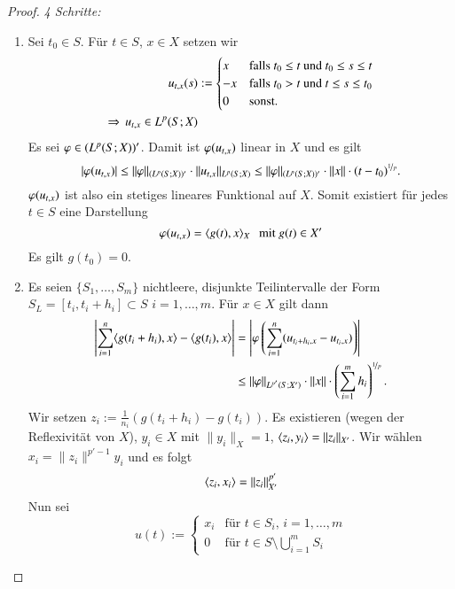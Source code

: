 \begin{proof}
    \textit{4 Schritte:}
    \begin{enumerate}
        \item %
        Sei $t_0\in S$. Für $t\in S$, $x\in X$ setzen wir
        \begin{align*}
            u_{t,x}(s) &:= \begin{cases} x & \text{falls $t_0\leq t$ und $t_0\leq s \leq t$}\\
                        -x & \text{falls $t_0>t$ und $t\leq s \leq t_0$} \\
                        0 & \text{sonst}.\end{cases}\\
            \Rightarrow \, u_{t,x} \in L^p (S;X)
        \end{align*}
        Es sei $\varphi\in (L^p(S;X))'$. Damit ist $\varphi(u_{t,x})$ linear in $X$ und es gilt
        \[
            |\varphi(u_{t,x})|\leq \|\varphi\|_{(L^p(S;X))'} \cdot\|u_{t,x}\|_{L^p(S;X)} \leq \|\varphi\|
            _{(L^p(S;X))'} \cdot \|x\|\cdot (t-t_0)^{\nicefrac1p}.
        \]
        $\varphi(u_{t,x})$ ist also ein stetiges lineares Funktional auf $X$. Somit existiert für jedes
        $t\in S$ eine Darstellung
        \[
            \varphi(u_{t,x})= \langle g(t),x\rangle _X \hspace{.25cm} \text{mit } g(t)\in X'
        \]
        Es gilt $g(t_0)=0$.
        \item %
        Es seien $\{S_1,…,S_m\}$ nichtleere, disjunkte Teilintervalle der Form $S_L=[t_i,t_i+h_i]\subset
        S$ $i=1,…,m$. Für $x\in X$ gilt dann
        \begin{align*}
            \left|\sum_{i=1}^n\langle g(t_i+h_i),x\rangle-\langle g(t_i),x\rangle\right|&= \left| \varphi
            \left( \sum_{i=1}^n (u_{t_i+h_i,x}-u_{t_i,x}) \right) \right|\\
                &\leq \|\varphi\|_{L^{p'}(S;X')}\cdot\|x\|\cdot\left(\sum_{i=1}^m h_i\right)^{\nicefrac1p}.
        \end{align*}
        Wir setzen $z_i:= \frac{1}{n_i}(g(t_i+h_i)-g(t_i))$. Es existieren (wegen der Reflexivität von
        $X$), $y_i\in X$ mit $\|y_i\|_X=1$, $\langle z_i,y_i\rangle = \|z_i\|_{X'}$. Wir wählen
        $x_i=\|z_i\|^{p'-1} y_i$ und es folgt
        \[
            \langle z_i,x_i \rangle = \|z_i\|^{p'}_{X'}
        \]
        Nun sei
        \[
            u(t):= \begin{cases} x_i & \text{für $t\in S_i$, $i=1,…,m$} \\
                   0 & \text{für } t\in S\setminus\bigcup_{i=1}^m S_i\end{cases}
\]
\end{enumerate}
\end{proof}
